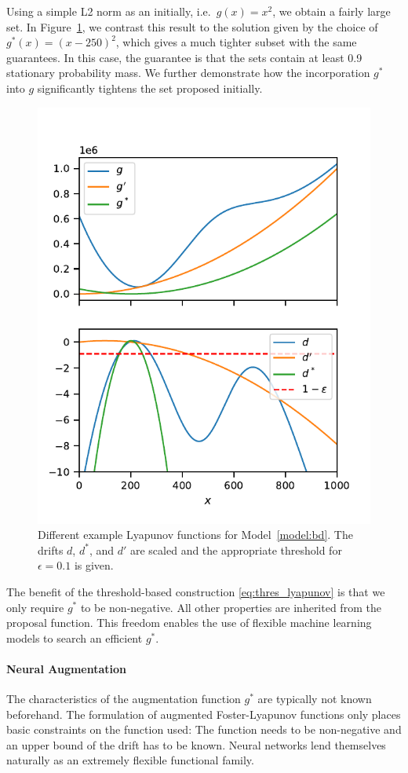 Using a simple L2 norm as an initially, i.e.\ $g(x) = x^2$, we obtain
a fairly large set.
In Figure~\ref{fig:bd:truncation}, we contrast this result to the
solution given by the choice of $g^*(x)=(x - 250)^2$, which gives a
much tighter subset with the same guarantees.
In this case, the guarantee is that the sets contain at least 0.9
stationary probability mass.
We further demonstrate how the incorporation $g^*$ into $g$
significantly tightens the set proposed initially.
\begin{figure}[htb]
  \centering
  \includegraphics[width=.6\textwidth]{gfx/lyapunov_bd.pdf}
  \caption[Augmented Foster-Lyapunov
  function]{\label{fig:bd:truncation}Different example Lyapunov
    functions for Model~\ref{model:bd}. The drifts $d$, $d^*$, and $d'$
  are scaled and the appropriate threshold for $\epsilon=0.1$ is given.}
\end{figure}

The benefit of the threshold-based construction
\eqref{eq:thres_lyapunov} is that we only require $g^*$ to be non-negative.
All other properties are inherited from the proposal function.
This freedom enables the use of flexible machine learning models to
search an efficient $g^*$.

\paragraph{Neural Augmentation}
The characteristics of the augmentation function $g^*$ are typically
not known beforehand.
The formulation of augmented Foster-Lyapunov functions only places
basic constraints on the function used:
The function needs to be non-negative and an upper bound of the drift
has to be known.
Neural networks lend themselves naturally as an extremely flexible
functional family.

